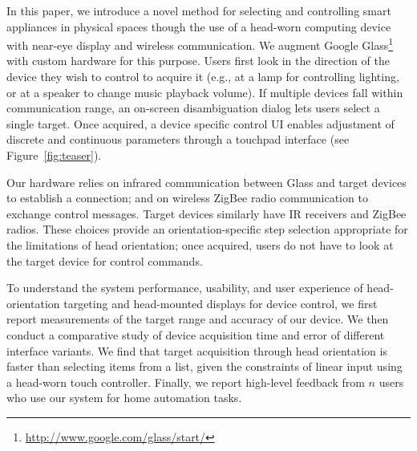 In this paper, we introduce a novel method for selecting and controlling smart appliances in physical spaces though the use of a head-worn computing device with near-eye display and wireless communication. We augment Google Glass\footnote{\url{http://www.google.com/glass/start/}} with custom hardware for this purpose. Users first look in the direction of the device they wish to control to acquire it (e.g., at a lamp for controlling lighting, or at a speaker to change music playback volume). If multiple devices fall within communication range, an on-screen disambiguation dialog lets users select a single target. Once acquired, a device specific control UI enables adjustment of discrete and continuous parameters through a touchpad interface (see Figure~\ref{fig:teaser}).

Our hardware relies on infrared communication between Glass and target devices to establish a connection; and on wireless ZigBee radio communication to exchange control messages.  Target devices similarly have IR receivers and ZigBee radios. These choices provide an orientation-specific  step selection appropriate for the limitations of head orientation; once acquired, users do not have to look at the target device for control commands.

To understand the system performance, usability, and user experience of head-orientation targeting and head-mounted displays for device control, we first report measurements of the target range and accuracy of our device. We then conduct a comparative study of device acquisition time and error of different interface variants. We find that target acquisition through head orientation is faster than selecting items from a list, given the constraints of linear input using a head-worn touch controller. Finally, we report high-level feedback from $n$ users who use our system for home automation tasks.



